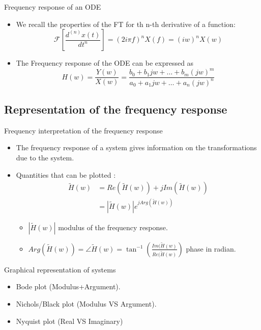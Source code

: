     \begin{block}{Frequency response of an ODE}
      \begin{itemize}
        \item We recall the properties of the FT for th n-th derivative of a function:
         $$ \mathcal{F}\left[\frac{d^{(n)}x(t)}{dt^n}\right]=(2i\pi
        f)^nX(f)=(iw)^nX(w)$$
        \item The Frequency response of the ODE can be expressed as 
        \begin{equation}
          \label{eq:edo_transf}
          H(w)=\frac{Y(w)}{X(w)}=\frac{b_0+b_1jw+\dots+b_m(jw)^m}{a_0+a_1jw+\dots+a_n(jw)^n}
        \end{equation}
      \end{itemize}
    \end{block}

    
    \subsection{Representation of the frequency response}
    \begin{block}{Frequency interpretation of the frequency response}
      \begin{itemize}
      \item The frequency response of a system gives information on the transformations due to the system.
      \item Quantities that can be plotted :
  \begin{align*}
    \tilde H(w)&= Re(\tilde H(w))+jIm(\tilde H(w))\\
  &=|\tilde H(w)|e^{jArg(\tilde H(w))}
  \end{align*}
  \vspace{-5mm}
  \begin{itemize}
  \item $|\tilde H(w)|$ modulus of the frequency response.
  \item $Arg(\tilde H(w))=\angle
  \tilde H(w)=\tan^{-1}\left(\frac{Im(\tilde H(w)}{Re(\tilde H(w)}\right)$ phase in radian.
  \end{itemize}
  
      \end{itemize}
    \end{block}
    \begin{exampleblock}{Graphical representation of systems}
      \begin{itemize}
      \item Bode plot (Modulus+Argument).
      \item Nichols/Black plot (Modulus VS Argument).
      \item Nyquist plot (Real VS Imaginary)
      \end{itemize}
    \end{exampleblock}



